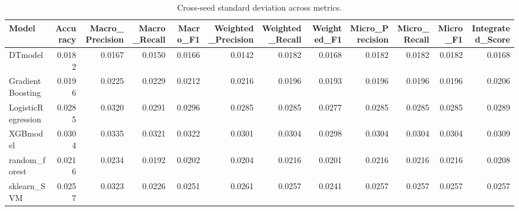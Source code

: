 \begin{table}[t]
\centering
\begin{tabular}{lrrrrrrrrrrr}
\toprule
Model & Accuracy & Macro_Precision & Macro_Recall & Macro_F1 & Weighted_Precision & Weighted_Recall & Weighted_F1 & Micro_Precision & Micro_Recall & Micro_F1 & Integrated_Score \\
\midrule
DTmodel & 0.0182 & 0.0167 & 0.0150 & 0.0166 & 0.0142 & 0.0182 & 0.0168 & 0.0182 & 0.0182 & 0.0182 & 0.0168 \\
GradientBoosting & 0.0196 & 0.0225 & 0.0229 & 0.0212 & 0.0216 & 0.0196 & 0.0193 & 0.0196 & 0.0196 & 0.0196 & 0.0206 \\
LogisticRegression & 0.0285 & 0.0320 & 0.0291 & 0.0296 & 0.0285 & 0.0285 & 0.0277 & 0.0285 & 0.0285 & 0.0285 & 0.0289 \\
XGBmodel & 0.0304 & 0.0335 & 0.0321 & 0.0322 & 0.0301 & 0.0304 & 0.0298 & 0.0304 & 0.0304 & 0.0304 & 0.0309 \\
random_forest & 0.0216 & 0.0234 & 0.0192 & 0.0202 & 0.0204 & 0.0216 & 0.0201 & 0.0216 & 0.0216 & 0.0216 & 0.0208 \\
sklearn_SVM & 0.0257 & 0.0323 & 0.0226 & 0.0251 & 0.0261 & 0.0257 & 0.0241 & 0.0257 & 0.0257 & 0.0257 & 0.0257 \\
\bottomrule
\end{tabular}
\caption{Cross-seed standard deviation across metrics.}
\label{tab:cross_seed_std}
\end{table}